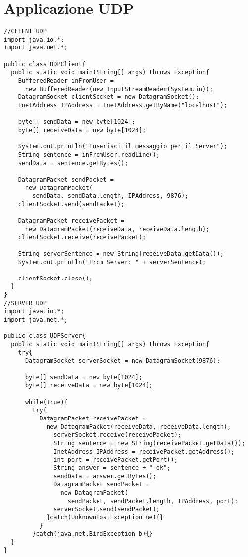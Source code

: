 \documentclass[a4paper, titlepage]{article}
\begin{document}
\newpage
{}
\section{Applicazione UDP}	
	\begin{lstlisting}
//CLIENT UDP
import java.io.*;
import java.net.*;

public class UDPClient{
  public static void main(String[] args) throws Exception{
	BufferedReader inFromUser = 
	  new BufferedReader(new InputStreamReader(System.in));
	DatagramSocket clientSocket = new DatagramSocket();
	InetAddress IPAddress = InetAddress.getByName("localhost");
    
	byte[] sendData = new byte[1024];
	byte[] receiveData = new byte[1024];
	
	System.out.println("Inserisci il messaggio per il Server");
	String sentence = inFromUser.readLine();
	sendData = sentence.getBytes();
	
	DatagramPacket sendPacket = 
	  new DatagramPacket(
	    sendData, sendData.length, IPAddress, 9876);
	clientSocket.send(sendPacket);
	
	DatagramPacket receivePacket =
	  new DatagramPacket(receiveData, receiveData.length);
	clientSocket.receive(receivePacket);
	
	String serverSentence = new String(receiveData.getData());
	System.out.println("From Server: " + serverSentence);
	
	clientSocket.close();
  }
}
//SERVER UDP
import java.io.*;
import java.net.*;

public class UDPServer{
  public static void main(String[] args) throws Exception{
    try{
      DatagramSocket serverSocket = new DatagramSocket(9876);
      
      byte[] sendData = new byte[1024];
      byte[] receiveData = new byte[1024];
      
      while(true){
        try{
          DatagramPacket receivePacket = 
            new DatagramPacket(receiveData, receiveData.length);
    		  serverSocket.receive(receivePacket);
    		  String sentence = new String(receivePacket.getData());
    		  InetAddress IPAddress = receivePacket.getAddress();
    		  int port = receivePacket.getPort();
    		  String answer = sentence + " ok";
    		  sendData = answer.getBytes();
    		  DatagramPacket sendPacket = 
    		    new DatagramPacket(
    		      sendPacket, sendPacket.length, IPAddress, port);
    		  serverSocket.send(sendPacket);
    		}catch(UnknownHostException ue){}
    	  }
    	}catch(java.net.BindException b){}
  }
}
	\end{lstlisting}
\end{document}

